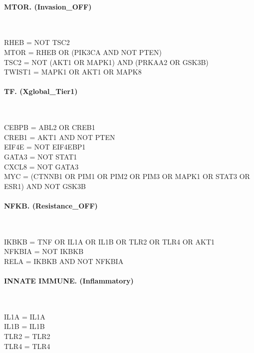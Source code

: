 \paragraph{MTOR. (Invasion\_OFF)}\mbox{}\\
\begin{flushleft}\ttfamily\small
RHEB = NOT TSC2\\
MTOR = RHEB OR (PIK3CA AND NOT PTEN)\\
TSC2 = NOT (AKT1 OR MAPK1) AND (PRKAA2 OR GSK3B)\\
TWIST1 = MAPK1 OR AKT1 OR MAPK8\\
\end{flushleft}

\paragraph{TF. (Xglobal\_Tier1)}\mbox{}\\
\begin{flushleft}\ttfamily\small
CEBPB = ABL2 OR CREB1\\
CREB1 = AKT1 AND NOT PTEN\\
EIF4E = NOT EIF4EBP1\\
GATA3 = NOT STAT1\\
CXCL8 = NOT GATA3\\
MYC = (CTNNB1 OR PIM1 OR PIM2 OR PIM3 OR MAPK1 OR STAT3 OR ESR1) AND NOT GSK3B\\
\end{flushleft}

\paragraph{NFKB. (Resistance\_OFF)}\mbox{}\\
\begin{flushleft}\ttfamily\small
IKBKB = TNF OR IL1A OR IL1B OR TLR2 OR TLR4 OR AKT1\\
NFKBIA = NOT IKBKB\\
RELA = IKBKB AND NOT NFKBIA\\
\end{flushleft}

\paragraph{INNATE IMMUNE. (Inflammatory)}\mbox{}\\
\begin{flushleft}\ttfamily\small
IL1A = IL1A\\
IL1B = IL1B\\
TLR2 = TLR2\\
TLR4 = TLR4\\
\end{flushleft}

